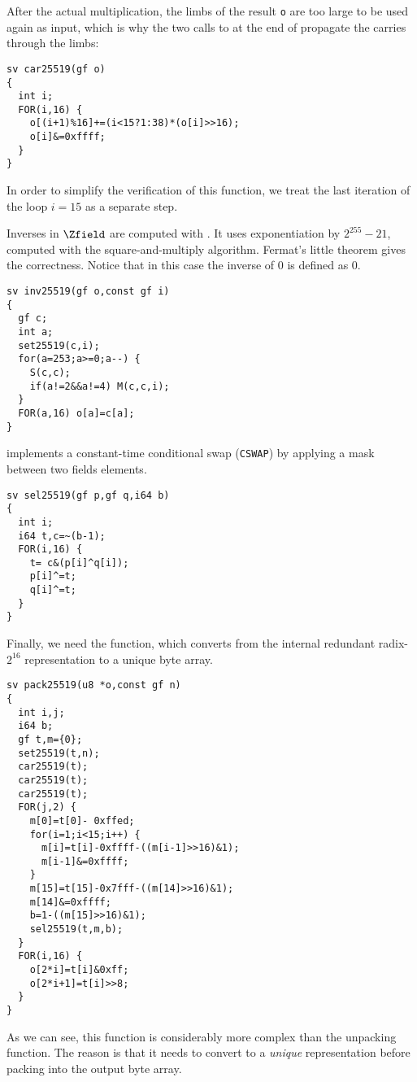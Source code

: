 After the actual multiplication, the limbs of the result \texttt{o} are
too large to be used again as input, which is why the two calls to
 at the end of  propagate the carries through the limbs:
\begin{lstlisting}[language=Ctweetnacl]
sv car25519(gf o)
{
  int i;
  FOR(i,16) {
    o[(i+1)%16]+=(i<15?1:38)*(o[i]>>16);
    o[i]&=0xffff;
  }
}
\end{lstlisting}

In order to simplify the verification of this function,
we treat the last iteration of the loop $i = 15$ as a separate step.

Inverses in $\Zfield$ are computed with .
It uses exponentiation by $2^{255}-21$, computed with the square-and-multiply
algorithm. Fermat's little theorem gives the correctness.
Notice that in this case the inverse of $0$ is defined as $0$.
\begin{lstlisting}[language=Ctweetnacl]
sv inv25519(gf o,const gf i)
{
  gf c;
  int a;
  set25519(c,i);
  for(a=253;a>=0;a--) {
    S(c,c);
    if(a!=2&&a!=4) M(c,c,i);
  }
  FOR(a,16) o[a]=c[a];
}
\end{lstlisting}

 implements a constant-time conditional swap (\texttt{CSWAP}) by
applying a mask between two fields elements.
\begin{lstlisting}[language=Ctweetnacl]
sv sel25519(gf p,gf q,i64 b)
{
  int i;
  i64 t,c=~(b-1);
  FOR(i,16) {
    t= c&(p[i]^q[i]);
    p[i]^=t;
    q[i]^=t;
  }
}
\end{lstlisting}

Finally, we need the  function,
which converts from the internal redundant radix-$2^{16}$
representation to a unique byte array.
\begin{lstlisting}[language=Ctweetnacl]
sv pack25519(u8 *o,const gf n)
{
  int i,j;
  i64 b;
  gf t,m={0};
  set25519(t,n);
  car25519(t);
  car25519(t);
  car25519(t);
  FOR(j,2) {
    m[0]=t[0]- 0xffed;
    for(i=1;i<15;i++) {
      m[i]=t[i]-0xffff-((m[i-1]>>16)&1);
      m[i-1]&=0xffff;
    }
    m[15]=t[15]-0x7fff-((m[14]>>16)&1);
    m[14]&=0xffff;
    b=1-((m[15]>>16)&1);
    sel25519(t,m,b);
  }
  FOR(i,16) {
    o[2*i]=t[i]&0xff;
    o[2*i+1]=t[i]>>8;
  }
}
\end{lstlisting}
As we can see, this function is considerably more complex than the
unpacking function. The reason is that it needs to convert
to a \emph{unique} representation before packing into the output
byte array.


